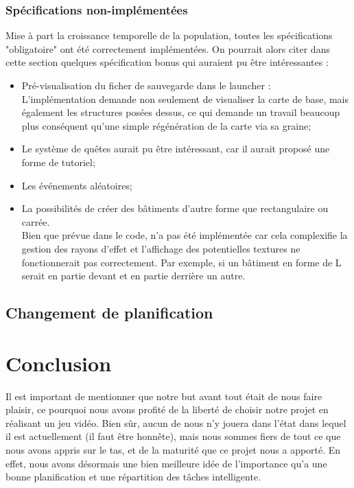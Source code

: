 \documentclass[a4paper,10pt,openany,oneside]{report}
\begin{document}
\subsection{Spécifications non-implémentées}
Mise à part la croissance temporelle de la population, toutes les spécifications "obligatoire" ont été correctement implémentées.
On pourrait alors citer dans cette section quelques spécification bonus qui auraient pu être intéressantes :
\begin{itemize}
\item Pré-visualisation du ficher de sauvegarde dans le launcher :\\
L'implémentation demande non seulement de visualiser la carte de base, mais également les structures posées dessus, ce qui demande un travail beaucoup plus conséquent qu'une simple régénération de la carte via sa graine;
\item Le système de quêtes aurait pu être intéressant, car il aurait proposé une forme de tutoriel;
\item Les événements aléatoires;
\item La possibilités de créer des bâtiments d'autre forme que rectangulaire ou carrée.\\
Bien que prévue dans le code, n'a pas été implémentée car cela complexifie la gestion des rayons d'effet et l'affichage des potentielles textures ne fonctionnerait pas correctement. Par exemple, si un bâtiment en forme de L serait en partie devant et en partie derrière un autre.
	
\end{itemize}

\section{Changement de planification}


\chapter{Conclusion}
\thispagestyle{headings}
Il est important de mentionner que notre but avant tout était de nous faire plaisir, ce pourquoi nous avons profité de la liberté de choisir notre projet en réalisant un jeu vidéo. Bien sûr, aucun de nous n'y jouera dans l'état dans lequel il est actuellement (il faut être honnête), mais nous sommes fiers de tout ce que nous avons appris sur le tas, et de la maturité que ce projet nous a apporté. En effet, nous avons désormais une bien meilleure idée de l'importance qu'a une bonne planification et une répartition des tâches intelligente.
\end{document}
